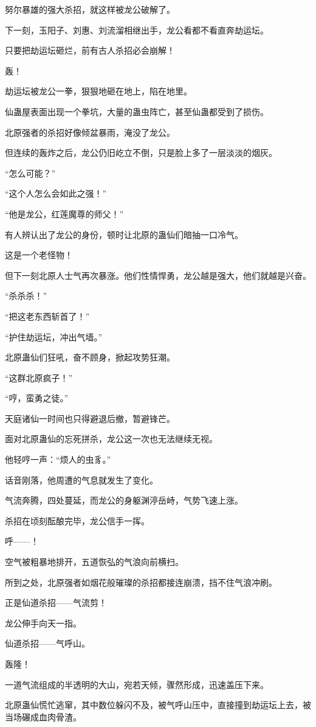 \begin{this_body}
努尔暴雄的强大杀招，就这样被龙公破解了。

下一刻，玉阳子、刘惠、刘流溜相继出手，龙公看都不看直奔劫运坛。

只要把劫运坛砸烂，前有古人杀招必会崩解！

轰！

劫运坛被龙公一拳，狠狠地砸在地上，陷在地里。

仙蛊屋表面出现一个拳坑，大量的蛊虫阵亡，甚至仙蛊都受到了损伤。

北原强者的杀招好像倾盆暴雨，淹没了龙公。

但连续的轰炸之后，龙公仍旧屹立不倒，只是脸上多了一层淡淡的烟灰。

“怎么可能？”

“这个人怎么会如此之强！”

“他是龙公，红莲魔尊的师父！”

有人辨认出了龙公的身份，顿时让北原的蛊仙们暗抽一口冷气。

这是一个老怪物！

但下一刻北原人士气再次暴涨。他们性情悍勇，龙公越是强大，他们就越是兴奋。

“杀杀杀！”

“把这老东西斩首了！”

“护住劫运坛，冲出气墙。”

北原蛊仙们狂吼，奋不顾身，掀起攻势狂潮。

“这群北原疯子！”

“哼，蛮勇之徒。”

天庭诸仙一时间也只得避退后撤，暂避锋芒。

面对北原蛊仙的忘死拼杀，龙公这一次也无法继续无视。

他轻哼一声：“烦人的虫豸。”

话音刚落，他周遭的气息就发生了变化。

气流奔腾，四处蔓延，而龙公的身躯渊渟岳峙，气势飞速上涨。

杀招在顷刻酝酿完毕，龙公信手一挥。

呼——！

空气被粗暴地排开，五道恢弘的气浪向前横扫。

所到之处，北原强者如烟花般璀璨的杀招都接连崩溃，挡不住气浪冲刷。

正是仙道杀招——气流剪！

龙公伸手向天一指。

仙道杀招——气呼山。

轰隆！

一道气流组成的半透明的大山，宛若天倾，骤然形成，迅速盖压下来。

北原蛊仙慌忙逃窜，其中数位躲闪不及，被气呼山压中，直接撞到劫运坛上去，被当场碾成血肉骨渣。


\end{this_body}
